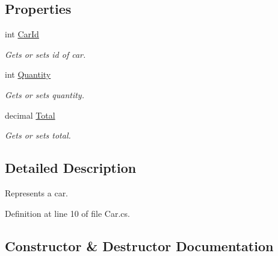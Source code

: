 \subsection*{Properties}
\begin{DoxyCompactItemize}
\item 
int \mbox{\hyperlink{class_test_project_1_1_task_library_1_1_tasks_1_1_lesson10_1_1_models_1_1_car_a3f46261730fb349ec16e002143b6e322}{Car\+Id}}
\begin{DoxyCompactList}\small\item\em Gets or sets id of car. \end{DoxyCompactList}\item 
int \mbox{\hyperlink{class_test_project_1_1_task_library_1_1_tasks_1_1_lesson10_1_1_models_1_1_car_a607dad544934ebbf7d0b26b77c3358a1}{Quantity}}
\begin{DoxyCompactList}\small\item\em Gets or sets quantity. \end{DoxyCompactList}\item 
decimal \mbox{\hyperlink{class_test_project_1_1_task_library_1_1_tasks_1_1_lesson10_1_1_models_1_1_car_ab717a111516a47377aa5f1e79c2ec8d7}{Total}}
\begin{DoxyCompactList}\small\item\em Gets or sets total. \end{DoxyCompactList}\end{DoxyCompactItemize}


\subsection{Detailed Description}
Represents a car. 



Definition at line 10 of file Car.\+cs.



\subsection{Constructor \& Destructor Documentation}
\mbox{\label{class_test_project_1_1_task_library_1_1_tasks_1_1_lesson10_1_1_models_1_1_car_adc0273608062cd65052471f0699bf2a5}} 
